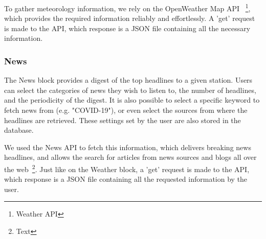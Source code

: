 To gather meteorology information, we rely on the OpenWeather Map \ac{API} ~\footnote{Weather API}, which provides the required information reliably and effortlessly. A 'get' request is made to the \ac{API}, which response is a JSON file containing all the necessary information. 

\newpage
\subsubsection{News}

The News block provides a digest of the top headlines to a given station. Users can select the categories of news they wish to listen to, the number of headlines, and the periodicity of the digest. It is also possible to select a specific keyword to fetch news from (e.g. "COVID-19"), or even select the sources from where the headlines are retrieved. These settings set by the user are also stored in the database.

We used the News \ac{API} to fetch this information, which delivers breaking news headlines, and allows the search for articles from news sources and blogs all over the web~\footnote{Text}. Just like on the Weather block, a 'get' request is made to the \ac{API}, which response is a JSON file containing all the requested information by the user.

